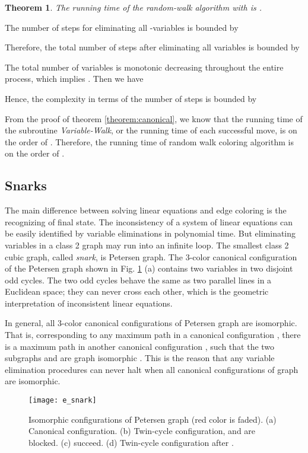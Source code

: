 \documentclass[11pt]{article}
\newtheorem{theorem}{Theorem}[section]
\newenvironment{proof}[1][Proof]{\begin{trivlist}
\item[\hskip \labelsep {\bfseries #1}]}{\end{trivlist}}
\newcommand{\qed}{\nobreak \ifvmode \relax \else
      \ifdim\lastskip<1.5em \hskip-\lastskip
      \hskip1.5em plus0em minus0.5em \fi \nobreak
      \vrule height0.75em width0.5em depth0.25em\fi}
\begin{document}
\begin{theorem} 
The running time of the random-walk algorithm with  is .
\end{theorem}
\begin{proof}
The number of steps  for eliminating all -variables is bounded by
\end{proof}

Therefore, the total number of steps  after eliminating all variables is bounded by
 
The total number of variables is monotonic decreasing throughout the entire process, which implies . Then we have
 
Hence, the complexity in terms of the number of steps is bounded by 

From the proof of theorem \ref{theorem:canonical}, we know that the running time of the subroutine {\it Variable-Walk}, or the running time of each successful move, is on the order of . Therefore, the running time of random walk coloring algorithm is on the order of .\qed



\subsection{Snarks}
The main difference between solving linear equations and edge coloring is the recognizing of final state. The inconsistency of a system of linear equations can be easily identified by variable eliminations in polynomial time. But eliminating variables in a class 2 graph may run into an infinite loop. The smallest class 2 cubic graph, called {\it snark}, is Petersen graph. The 3-color canonical configuration of the Petersen graph shown in Fig. \ref{fig:snark} (a) contains two variables in two disjoint odd cycles. The two odd cycles behave the same as two parallel lines in a Euclidean space; they can never cross each other, which is the geometric interpretation of inconsistent linear equations.
 
In general, all 3-color canonical configurations of Petersen graph are isomorphic. That is, corresponding to any maximum  path   in a canonical configuration , there is a maximum  path   in another canonical configuration , such that the two subgraphs  and  are graph isomorphic \cite{west2001introduction}. This is the reason that any variable elimination procedures can never halt when all canonical configurations of graph  are isomorphic. 
\begin{figure}[htpb]
	\centering
	\texttt{[image: e\_snark]}
	\caption{Isomorphic configurations of Petersen graph (red color is faded). (a) Canonical configuration. (b) Twin-cycle configuration,  and  are blocked. (c)  succeed. (d) Twin-cycle configuration after .}
	\label{fig:snark}
\end{figure}
\end{document}
